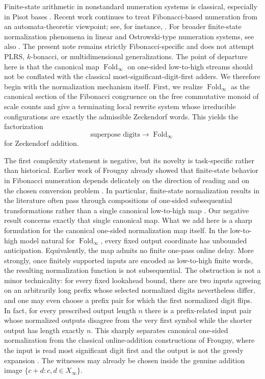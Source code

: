 \documentclass[11pt,letterpaper]{article}
\numberwithin{equation}{section}
\theoremstyle{plain}
\theoremstyle{definition}
\theoremstyle{remark}
\newcommand{\Xinf}{X_\infty}
\DeclareMathOperator{\Fold}{Fold}
\begin{document}
Finite-state arithmetic in nonstandard numeration systems is classical,
especially in Pisot bases
\cite{Frougny1991FibonacciFiniteAutomata,Frougny1992NumbersAutomata,Frougny1999OnlineAddition}.  Recent work
continues to treat Fibonacci-based numeration from an automata-theoretic
viewpoint; see, for instance,
\cite{AhlbachUsatineFrougnyPippenger2013,LabbeLepsova2023FibonacciTwosComplement}.
For broader finite-state normalization phenomena in linear and Ostrowski-type
numeration systems, see also
\cite{Frougny1992NumbersAutomata,HieronymiTerry2018OstrowskiAddition}.  The
present note remains strictly Fibonacci-specific and does not attempt PLRS,
$k$-bonacci, or multidimensional generalizations.
The point of departure here is that the canonical map $\Fold_\infty$ on
one-sided low-to-high streams should not be conflated with the classical
most-significant-digit-first adders.  We therefore begin with the
normalization mechanism itself.  First, we realize $\Fold_\infty$ as the
canonical section of the Fibonacci congruence on the free commutative monoid
of scale counts and give a terminating local rewrite system whose irreducible
configurations are exactly the admissible Zeckendorf words.  This yields the
factorization
\[
\text{superpose digits} \longrightarrow \Fold_\infty
\]
for Zeckendorf addition.

The first complexity statement is negative, but its novelty is task-specific
rather than historical.  Earlier work of Frougny already showed that
finite-state behavior in Fibonacci numeration depends delicately on the
direction of reading and on the chosen conversion problem
\cite{Frougny1991FibonacciFiniteAutomata,Frougny1992NumbersAutomata,Frougny1999OnlineAddition}.
In particular, finite-state normalization results in the literature often pass
through compositions of one-sided subsequential transformations rather than a
single canonical low-to-high map \cite{Frougny1992NumbersAutomata}.  Our
negative result concerns exactly that single canonical map.
What we add here is a sharp formulation for the canonical one-sided
normalization map itself.  In the low-to-high model natural for
$\Fold_\infty$, every fixed output coordinate has unbounded anticipation.
Equivalently, the map admits no finite one-pass online delay.  More strongly,
once finitely supported inputs are encoded as low-to-high finite words, the
resulting normalization function is not subsequential.  The obstruction is not
a minor technicality: for every fixed lookahead bound, there are two inputs
agreeing on an arbitrarily long prefix whose selected normalized digits
nevertheless differ, and one may even choose a prefix pair for which the first
normalized digit flips.  In fact, for every prescribed output length $n$ there
is a prefix-related input pair whose normalized outputs disagree from the very
first symbol while the shorter output has length exactly $n$.  This sharply
separates canonical one-sided
normalization from the classical online-addition constructions of Frougny,
where the input is read most significant digit first and the output is not the
greedy expansion \cite[Prop.~13]{Frougny1999OnlineAddition}.  The witnesses
may already be chosen inside the genuine addition image $\{c+d:c,d\in\Xinf\}$.
\end{document}

